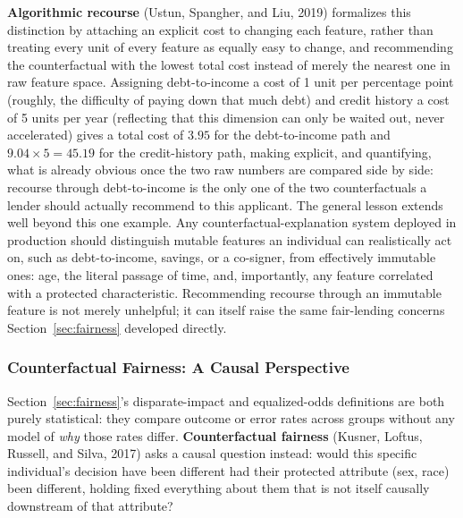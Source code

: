 \documentclass[../ai_in_finance]{subfiles}
\begin{document}
\textbf{Algorithmic recourse} (Ustun, Spangher, and Liu, 2019) formalizes this distinction by attaching an explicit cost to changing each feature, rather than treating every unit of every feature as equally easy to change, and recommending the counterfactual with the lowest total cost instead of merely the nearest one in raw feature space. Assigning debt-to-income a cost of 1 unit per percentage point (roughly, the difficulty of paying down that much debt) and credit history a cost of 5 units per year (reflecting that this dimension can only be waited out, never accelerated) gives a total cost of $3.95$ for the debt-to-income path and $9.04 \times 5 = 45.19$ for the credit-history path, making explicit, and quantifying, what is already obvious once the two raw numbers are compared side by side: recourse through debt-to-income is the only one of the two counterfactuals a lender should actually recommend to this applicant. The general lesson extends well beyond this one example. Any counterfactual-explanation system deployed in production should distinguish mutable features an individual can realistically act on, such as debt-to-income, savings, or a co-signer, from effectively immutable ones: age, the literal passage of time, and, importantly, any feature correlated with a protected characteristic. Recommending recourse through an immutable feature is not merely unhelpful; it can itself raise the same fair-lending concerns Section~\ref{sec:fairness} developed directly.

\subsubsection*{Counterfactual Fairness: A Causal Perspective}

Section~\ref{sec:fairness}'s disparate-impact and equalized-odds definitions are both purely statistical: they compare outcome or error rates across groups without any model of \emph{why} those rates differ. \textbf{Counterfactual fairness} (Kusner, Loftus, Russell, and Silva, 2017) asks a causal question instead: would this specific individual's decision have been different had their protected attribute (sex, race) been different, holding fixed everything about them that is not itself causally downstream of that attribute?
\end{document}
